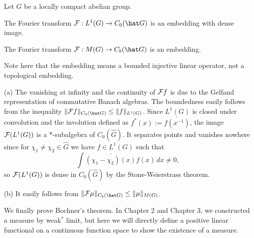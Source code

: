 \documentclass[a4paper]{article}
\begin{document}
\begin{prop}
Let $G$ be a locally compact abelian group.
\begin{parts}
\item The Fourier transform $\cF:L^1(G)\to C_0(\hat G)$ is an embedding with dense image.
\item The Fourier transform $\cF:M(G)\to C_b(\hat G)$ is an embedding.
\end{parts}
\end{prop}
\begin{pf}
Note here that the embedding means a bounded injective linear operator, not a topological embedding.

(a)
The vanishing at infinity and the continuity of $\mathcal{F} f$ is due to the Gelfand representation of commutative Banach algebras.
The boundedness easily follows from the inequality $\|\cF f\|_{C_0(\hat G)}\le\|f\|_{L^1(G)}$.
Since $L^1(G)$ is closed under convolution and the involution defined as $f^*(x):=\bar{f(x^{-1})}$, the image $\mathcal{F}(L^1(G))$ is a $*$-subalgebra of $C_0(\hat G)$.
It separates points and vanishes nowhere since for $\chi_1\ne\chi_2\in\hat G$ we have $f\in L^1(G)$ such that
\[\int\bar{(\chi_1-\chi_2)(x)}f(x)\,dx\ne0,\]
so $\mathcal{F}(L^1(G))$ is dense in $C_0(\hat G)$ by the Stone-Weierstrass theorem.

(b)
It easily follows from $\|\cF \mu\|_{C_b(\hat G)}\le\|\mu\|_{M(G)}$.
\end{pf}

We finally prove Bochner's theorem.
In Chapter 2 and Chapter 3, we constructed a measure by weak$^*$ limit, but here we will directly define a positive linear functional on a continuous function space to show the existence of a measure.
\end{document}
